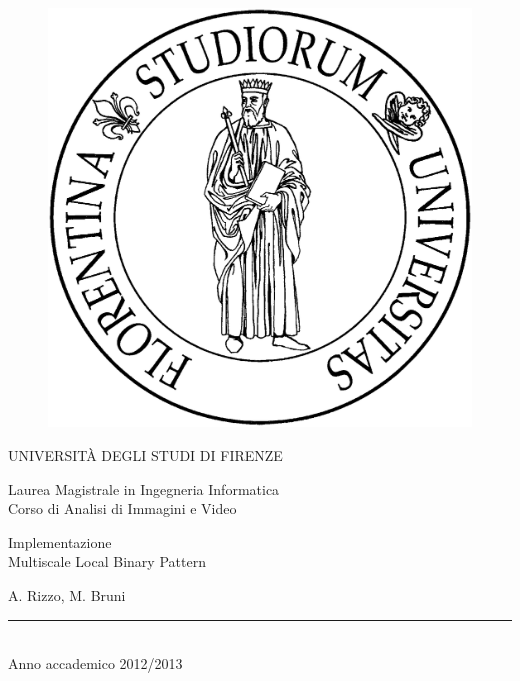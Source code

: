 \documentclass[a4paper,10pt]{article}
\begin{document}

\begin{titlepage}
\thispagestyle{empty}
\topmargin=1cm
\large

\begin{figure}[ht]
\centering
\includegraphics[scale=0.075]{img/Stemma.jpg}
\end{figure}

\begin{center}

UNIVERSITÀ DEGLI STUDI DI FIRENZE
\vspace{0.5cm}

Laurea Magistrale in Ingegneria Informatica
\\
\normalsize
Corso di Analisi di Immagini e Video
\vspace{4cm}

\begin{huge}
Implementazione \\
Multiscale Local Binary Pattern
\end{huge}

\vspace{0.5cm}

A. Rizzo, M. Bruni

\vspace{5cm}
\rule{5cm}{.4pt}
\\
Anno accademico 2012/2013
\end{center}
\end{titlepage}
\end{document}
